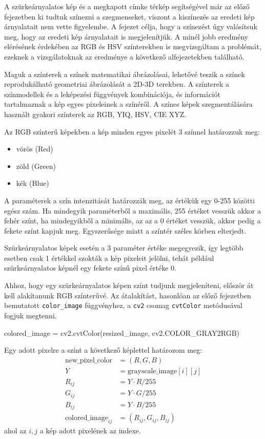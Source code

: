 
A szürkeárnyalatos kép és a megkapott címke térkép segítségével már az előző fejezetben ki tudtuk színezni a szegmenseket, viszont a kiszínezés az eredeti kép árnyalatait nem vette figyelembe. A fejezet célja, hogy a színezést úgy valósítsuk meg, hogy az eredeti kép árnyalatait is megjelenítjük. A minél jobb eredmény elérésének érdekében az RGB és HSV színterekben is megvizsgáltam a problémát, ezeknek a vizsgálatoknak az eredménye a következő alfejezetekben található.

Maguk a színterek a színek matematikai ábrázolásai, lehetővé teszik a színek reprodukálható geometriai ábrázolását a 2D-3D terekben. A színterek a színmodellek és a leképezési függvények kombinációja, és információt tartalmaznak a kép egyes pixeleinek a színéről. A színes képek szegmentálására használt gyakori színterek az RGB, YIQ, HSV, CIE XYZ. \cite{colorspaces}


Az RGB színterű képekben a kép minden egyes pixelét 3 színnel határozzuk meg:
\begin{itemize}
\item vörös (Red)
\item zöld (Green)
\item kék (Blue)
\end{itemize}
A paraméterek a szín intenzitását határozzák meg, az értékük egy 0-255 közötti egész szám. Ha mindegyik paraméterből a maximális, 255 értéket vesszük akkor a fehér színt, ha mindegyikből a minimális, az az a 0 értéket vesszük, akkor pedig a fekete színt kapjuk meg.  Egyszerűsége miatt a színtér széles körben elterjedt. \cite{colorspaces}

Szürkeárnyalatos képek esetén a 3 paraméter értéke megegyezik, így legtöbb esetben csak 1 értékkel szokták a kép pixeleit jelölni, tehát például szürkeárnyalatos képnél egy fekete színű pixel értéke 0.

Ahhoz, hogy egy szürkeárnyalatos képen színt tudjunk megjeleníteni, először át kell alakítanunk RGB színterűvé. Az átalakítást, hasonlóan az előző fejezetben bemutatott \texttt{color\_image} függvényhez, a \texttt{cv2} csomag \texttt{cvtColor} metódusával fogjuk megtenni.
\begin{python}
colored_image = cv2.cvtColor(resized_image, cv2.COLOR_GRAY2RGB)
\end{python}

Egy adott pixelre a színt a következő képlettel határozom meg:
\begin{align*}
 \text{new\_pixel\_color} & = (R, G, B) \\
 Y & = \text{grayscale\_image}[i][j]\\
 R_{ij} & = Y \cdot R / 255 \\
 G_{ij} & = Y \cdot G / 255 \\
 B_{ij} & = Y \cdot B / 255 \\
 \text{colored\_image}_{ij} & = (R_{ij}, G_{ij}, B_{ij})
\end{align*}
\noindent ahol az $i,j$ a kép adott pixelének az indexe.


